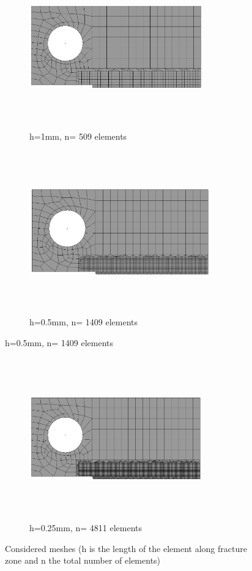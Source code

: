 \documentclass[a4paper,12pt,twoside]{report}
\begin{document}
\begin{figure}[htbp!]
      \begin{subfigure}{0.35\textwidth}
          \includegraphics[width=7.5cm,height=7cm,keepaspectratio]{26.h=1mm.png}
         \caption{h=1mm, n= 509 elements}
         \label{fig:1mm}
     \end{subfigure}
    \hspace{3cm}
     \begin{subfigure}{0.35\textwidth}
         \includegraphics[width=7.8cm,height=7cm,keepaspectratio]{26.h=0.5mm.png}
         \caption{h=0.5mm, n= 1409 elements}
         \label{fig:0.5mm}
     \end{subfigure}
\end{figure}
\FloatBarrier
\begin{figure}[htbp!]\ContinuedFloat
     \centering
     \begin{subfigure}{0.35\textwidth}
         \includegraphics[width=7.5cm,height=7cm,keepaspectratio]{26.h=0.25mm.png}
         \caption{h=0.25mm, n= 4811 elements}
         \label{fig:0.25mm}
     \end{subfigure}
    \caption{Considered meshes (h is the length of the element along fracture zone and n the total number of elements) }
    \label{fig:Considered meshes 2}
\end{figure}
\end{document}
